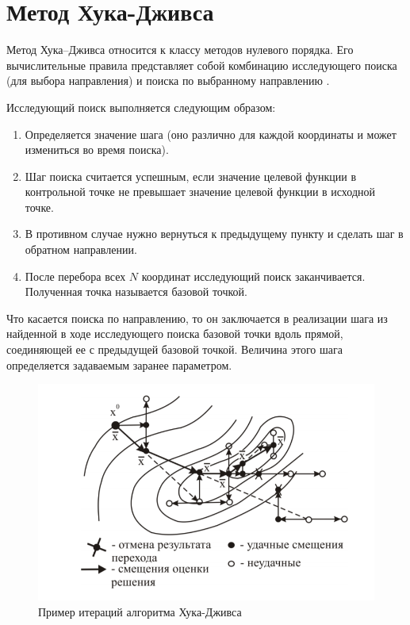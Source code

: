 \documentclass{svproc}
\begin{document}
\section{Метод Хука-Дживса}

Метод Хука–Дживса относится к классу методов нулевого порядка. Его вычислительные правила представляет собой комбинацию исследующего поиска (для выбора направления) и поиска по выбранному направлению \cite{fio_bib14, fio_bib15}.

Исследующий поиск выполняется следующим образом: 
\begin{enumerate}
\item	Определяется значение шага (оно различно для каждой координаты и может измениться во время поиска). 
\item	Шаг поиска считается успешным, если значение целевой функции в контрольной точке не превышает значение целевой функции в исходной точке. 
\item	В противном случае нужно вернуться к предыдущему пункту и сделать шаг в обратном направлении. 
\item	После перебора всех $N$ координат исследующий поиск заканчивается. Полученная точка называется базовой точкой.
\end{enumerate}




Что касается поиска по направлению, то он заключается в реализации шага из найденной в ходе исследующего поиска базовой точки вдоль прямой, соединяющей ее с предыдущей базовой точкой. Величина этого шага определяется задаваемым заранее параметром.

\begin{figure}[!h]
	\begin{center}
		\begin{minipage}[h]{0.8\linewidth}
			\includegraphics[width=1\linewidth]{figure/fig1.png}
			\caption{Пример итераций алгоритма Хука-Дживса} %
			\label{fig:fig1}
		\end{minipage}
	\end{center}
\end{figure}	
\end{document}

